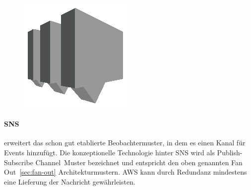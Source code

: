 \documentclass[
12pt,
english,
ngerman,
headsepline,
twoside,
openright,
numbers=noenddot,version=first
]{scrreprt}
\begin{document}
\begin{figure}
	\includegraphics[width=0.9\linewidth]{./pics/aws/Messaging_GRAYSCALE_AmazonSNS.eps}
\end{figure}
\paragraph{\acrfull{SNS}}\label{par:sns} erweitert das schon gut etablierte Beobachtermuster, in dem es einen Kanal für Events hinzufügt. Die konzeptionelle Technologie hinter \acrshort{SNS} wird als \glqq Publish-Subscribe Channel\cite{patternIntegrationEnterprise}\grqq\ Muster bezeichnet und entspricht den oben genannten \glqq Fan Out\grqq\ \autoref{sec:fan-out} Architekturmustern. AWS kann durch Redundanz mindestens eine Lieferung der Nachricht gewährleisten.
\end{document}
